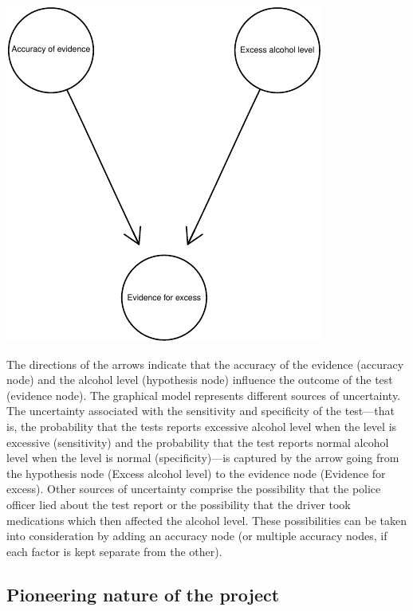 \documentclass[11pt,dvipsnames,enabledeprecatedfontcommands]{scrartcl}
\begin{document}
\begin{center}\includegraphics{BNfiles/unnamed-chunk-7-1} \end{center}

\noindent The directions of the arrows indicate that the accuracy of the
evidence (accuracy node) and the alcohol level (hypothesis node)
influence the outcome of the test (evidence node). The graphical model
represents different sources of uncertainty. The uncertainty associated
with the sensitivity and specificity of the test---that is, the
probability that the tests reports excessive alcohol level when the
level is excessive (sensitivity) and the probability that the test
reports normal alcohol level when the level is normal (specificity)---is
captured by the arrow going from the hypothesis node
(\textsf{Excess alcohol level}) to the evidence node
(\textsf{Evidence for excess}). Other sources of uncertainty comprise
the possibility that the police officer lied about the test report or
the possibility that the driver took medications which then affected the
alcohol level. These possibilities can be taken into consideration by
adding an accuracy node (or multiple accuracy nodes, if each factor is
kept separate from the other).


\hypertarget{pioneering-nature-of-the-project}{%
\subsection{Pioneering nature of the
project}\label{pioneering-nature-of-the-project}}
\end{document}
